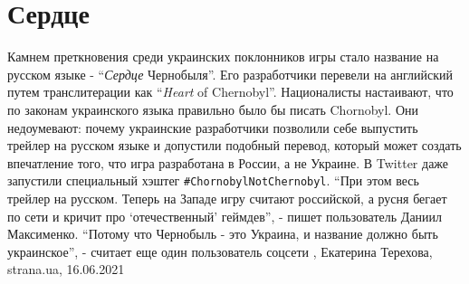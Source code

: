  
 
 
 
 
\chapter{Сердце}

Камнем преткновения среди украинских поклонников игры стало название на русском
языке - \enquote{\emph{Сердце} Чернобыля}. Его разработчики перевели на
английский путем транслитерации как \enquote{\emph{Heart} of Chernobyl}.
Националисты настаивают, что по законам украинского языка правильно было бы
писать Chornobyl. Они недоумевают: почему украинские разработчики позволили
себе выпустить трейлер на русском языке и допустили подобный перевод, который
может создать впечатление того, что игра разработана в России, а не Украине.  В
Twitter даже запустили специальный хэштег \verb|#ChornobylNotChernobyl|.
\enquote{При этом весь трейлер на русском. Теперь на Западе игру считают
российской, а русня бегает по сети и кричит про \enquote{отечественный}
геймдев}, - пишет пользователь Даниил Максименко.  \enquote{Потому что
Чернобыль - это Украина, и название должно быть украинское}, - считает еще один
пользователь соцсети
, 
Екатерина Терехова, strana.ua, 16.06.2021

